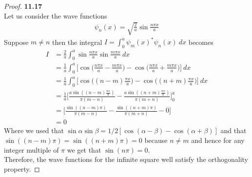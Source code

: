 \documentclass[11pt]{article}
\theoremstyle{definition}
\begin{document}
\cleardoublepage
\begin{proof}{\textbf{11.17}}\\
Let us consider the wave functions
\begin{align*}
    \psi_n(x) = \sqrt{\frac{2}{a}}\sin \frac{n\pi x}{a}
\end{align*}
Suppose $m \neq n$ then the integral $I = \int_0^a \psi_m(x)^*\psi_n(x)~dx$
becomes
\begin{align*}
    I &= \frac{2}{a}\int_0^a \sin \frac{n\pi x}{a}\sin \frac{m\pi x}{a} ~dx \\
    &= \frac{1}{a}\int_0^a \bigg[
        \cos\bigg(\frac{n\pi x}{a}- \frac{m\pi x}{a}\bigg)
        - \cos\bigg(\frac{n\pi x}{a} + \frac{m\pi x}{a}\bigg)
    \bigg]~dx \\
    &= \frac{1}{a}\int_0^a \bigg[
        \cos \bigg((n-m)\frac{\pi x}{a}\bigg)
        - \cos \bigg((n+m)\frac{\pi x}{a}\bigg)
    \bigg]~dx \\
    &= \frac{1}{a} \bigg[
        \frac{a\sin ((n-m)\frac{\pi x}{a})}{\pi (m - n)}
        - \frac{a\sin ((n+m)\frac{\pi x}{a})}{\pi (m + n)}
    \bigg]_0^a\\
    &= \bigg[
        \frac{\sin ((n-m)\pi)}{\pi (m - n)}
        - \frac{\sin ((n+m)\pi)}{\pi (m + n)} - 0
    \bigg]\\
    &= 0
\end{align*}
Where we used that
$\sin\alpha\sin\beta = 1/2[\cos(\alpha - \beta) - \cos(\alpha + \beta)]$
and that $\sin((n - m)\pi) = \sin((n + m)\pi) = 0$ because $n \neq m$
and hence for any integer multiple of $\pi$ we get that $\sin(n\pi)=0$.\\
Therefore, the wave functions for the infinite square well satisfy the
orthogonality property.
\end{proof}
\end{document}
